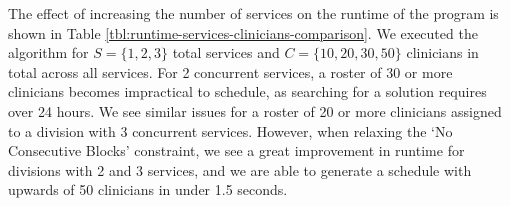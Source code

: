 The effect of increasing the number of services %
on the runtime of the program is shown in Table \ref{tbl:runtime-services-clinicians-comparison}. We executed the algorithm for $S = \{1, 2, 3\}$ total services and $C = \{10, 20, 30, 50\}$ clinicians in total across all services. For 2 concurrent services, a roster of 30 or more clinicians becomes impractical to schedule, as searching for a solution requires over 24 hours. We see similar issues for a roster of 20 or more clinicians assigned to a division with 3 concurrent services. However, when relaxing the `No Consecutive Blocks' constraint, we see a great improvement in runtime for divisions with 2 and 3 services, and we are able to generate a schedule with upwards of 50 clinicians in under 1.5 seconds. \\  %

